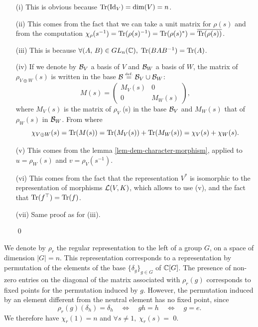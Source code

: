 \begin{proofnoqed}
\begin{itemize}
\item [{\upshape (i)}] This is obvious because $ \operatorname{Tr} (\operatorname{Id}_V) = \dim (V) = n $.
\item [{\upshape (ii)}]   This comes from the fact that we can take a unit matrix for $ \rho (s) $ and from the computation $ \chi_{\rho} (s^{-1}) = \operatorname{Tr} (\rho (s)^{-1}) = \operatorname{Tr} (\rho (s)^*) = \overline{\operatorname{Tr} (\rho (s))} $.
\item [{\upshape (iii)}] This is because $ \forall (A, \, B) \in GL_n (\mathbb{C}), \; \operatorname{Tr} (BAB^{-1}) = \operatorname{Tr} (A) $.
\item [{\upshape (iv)}] If we denote by $ \mathcal{B}_V $ a basis of $V$ and $ \mathcal{B}_W $ a basis of $ W $, the matrix of $ \rho_{V \oplus W} (s ) $ is written in the base $ \mathcal{B} \stackrel{\mbox{\upshape\tiny def.}}{=} \mathcal{B}_V \cup \mathcal{B}_W $:
\begin{equation*}
M (s) = \begin{pmatrix} M_V (s) & 0 \\0 & M_W (s) \end{pmatrix},
\end{equation*}
where $ M_V (s) $ is the matrix of $ \rho_V $ (s) in the base $ \mathcal{B}_V $ and $ M_W (s) $ that of $ \rho_W (s) $ in $ \mathcal{B}_W $. From where
\begin{equation*}
\chi_{V \oplus W} (s) = \operatorname{Tr} (M (s)) = \operatorname{Tr} (M_V (s)) + \operatorname{Tr} (M_W (s)) = \chi_V (s) + \chi_W (s) .
\end{equation*}
 
\item [{\upshape (v)}] This comes from the lemma \ref{lem-dem-character-morphism}, applied to $ u = \rho_W (s) $ and $ v = \rho_V (s^{- 1 }) $.
\item [{\upshape (vi)}] This comes from the fact that the representation $ V^* $ is isomorphic to the representation of morphisms $ \mathcal{L} (V, K) $, which allows to use (v), and the fact that $ \operatorname{Tr} (f^\top) = \operatorname{Tr} (f) $.
\item [{\upshape (vii)}] Same proof as for (iii).{\raggedright \qed}
\end{itemize}
\end{proofnoqed}
 
 
\begin{exmp}
\label{exmp-regular-representation}
 We denote by $ \rho_r $ the regular representation to the left of a group $G$, on a space of dimension $ |G| = n $. This representation corresponds to a representation by permutation of the elements of the base $ \{\delta_g\}_{g \in G} $ of $ \mathbb{C} [G] $. The presence of non-zero entries on the diagonal of the matrix associated with $ \rho_r (g) $ corresponds to fixed points for the permutation induced by $ g $. However, the permutation induced by an element different from the neutral element has no fixed point, since
\begin{equation*}
\rho_r (g) (\delta_h) = \delta_h \quad \Leftrightarrow \quad gh = h \quad \Leftrightarrow \quad g = e.
\end{equation*}
We therefore have $ \chi_r (1) = n $ and $ \forall s \neq 1, \; \chi_r (s) = $ 0.
\end{exmp}
 
